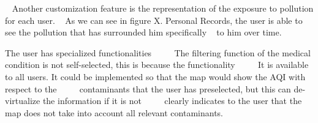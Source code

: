       Another customization feature is the representation of the exposure to pollution for each user.
      As we can see in figure X. Personal Records, the user is able to see the pollution that has surrounded him specifically
      to him over time.

 
\begin{itemize}
   \done The user has specialized functionalities
        \crossed The filtering function of the medical condition is not self-selected, this is because the functionality
        It is available to all users. It could be implemented so that the map would show the AQI with respect to the
        contaminants that the user has preselected, but this can de-virtualize the information if it is not
        clearly indicates to the user that the map does not take into account all relevant contaminants.
\end{itemize}
 \newpage